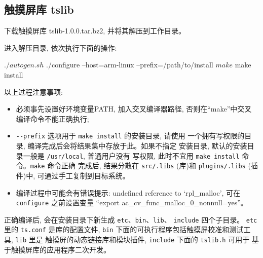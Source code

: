\subsection{触摸屏库 tslib}
下载触摸屏库 tslib-1.0.0.tar.bz2, 并将其解压到工作目录。

进入解压目录, 依次执行下面的操作:
\begin{blockcode}
$ ./autogen.sh
$ ./configure --host=arm-linux --prefix=/path/to/install
$ make
$ make install
\end{blockcode}

以上过程注意事项:
\begin{itemize}
    \item 必须事先设置好环境变量PATH, 加入交叉编译器路径, 否则在``make''中交叉
        编译命令不能正确执行;
    \item \verb|--prefix| 选项用于 \verb|make install| 的安装目录, 请使用
        一个拥有写权限的目录, 编译完成后会将结果集中存放于此。如果不指定
        安装目录, 默认的安装目录一般是 \verb|/usr/local|, 普通用户没有
        写权限, 此时不宜用 \verb|make install| 命令。\verb|make| 命令正确
        完成后, 结果分散在 \verb|src/.libs| (库)和 \verb|plugins/.libs|
        (插件)中, 可通过手工复制到目标系统。

    \item 编译过程中可能会有错误提示: undefined reference to `rpl\_malloc',
        可在 \verb|configure| 之前设置变量
        ``export ac\_cv\_func\_malloc\_0\_nonnull=yes''。
\end{itemize}

正确编译后, 会在安装目录下新生成 \verb|etc|、\verb|bin|、\verb|lib|、
\verb|include| 四个子目录。 \verb|etc|里的 \verb|ts.conf| 是库的配置文件,
\verb|bin| 下面的可执行程序包括触摸屏校准和测试工具, \verb|lib| 里是
触摸屏的动态链接库和模块插件, \verb|include| 下面的 \verb|tslib.h| 可用于
基于触摸屏库的应用程序二次开发。

